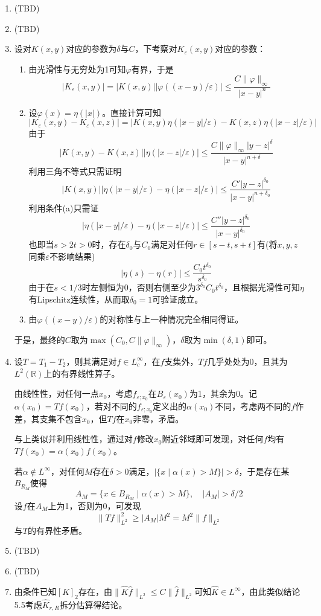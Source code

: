 \documentclass[a4paper,UTF8,fontset=windows]{ctexart}
\begin{document}
\begin{enumerate}
    \item (TBD)
    \item (TBD)
    \item 设对$K(x,y)$对应的参数为$\delta$与$C$，下考察对$K_\varepsilon(x,y)$对应的参数：
    \begin{enumerate}
        \item 由光滑性与无穷处为1可知$\varphi$有界，于是
        $$|K_\varepsilon(x,y)|=|K(x,y)||\varphi((x-y)/\varepsilon)|\le\frac{C\|\varphi\|_\infty}{|x-y|^n}$$
        \item 设$\varphi(x)=\eta(|x|)$。直接计算可知
        $$|K_\varepsilon(x,y)-K_\varepsilon(x,z)|=|K(x,y)\eta(|x-y|/\varepsilon)-K(x,z)\eta(|x-z|/\varepsilon)|$$
        由于
        $$|K(x,y)-K(x,z)||\eta(|x-z|/\varepsilon)|\le\frac{C\|\varphi\|_\infty|y-z|^\delta}{|x-y|^{n+\delta}}$$
        利用三角不等式只需证明
        $$|K(x,y)||\eta(|x-y|/\varepsilon)-\eta(|x-z|/\varepsilon)|\le\frac{C'|y-z|^{\delta_0}}{|x-y|^{n+\delta_0}}$$
        利用条件(a)只需证
        $$|\eta(|x-y|/\varepsilon)-\eta(|x-z|/\varepsilon)|\le \frac{C''|y-z|^{\delta_0}}{|x-y|^{\delta_0}}$$
        也即当$s>2t>0$时，存在$\delta_0$与$C_0$满足对任何$r\in[s-t,s+t]$有(将$x,y,z$同乘$\varepsilon$不影响结果)
        $$|\eta(s)-\eta(r)|\le\frac{C_0t^{\delta_0}}{s^{\delta_0}}$$
        由于在$s<1/3$时左侧恒为0，否则右侧至少为$3^{\delta_0} C_0t^{\delta_0}$，且根据光滑性可知$\eta$有Lipschitz连续性，从而取$\delta_0=1$可验证成立。

        \item 由$\varphi((x-y)/\varepsilon)$的对称性与上一种情况完全相同得证。
    \end{enumerate}
    于是，最终的$C$取为$\max(C_0,C\|\varphi\|_\infty)$，$\delta$取为$\min(\delta,1)$即可。

    \item 设$T=T_1-T_2$，则其满足对$f\in L_c^\infty$，在$f$支集外，$Tf$几乎处处为0，且其为$L^2(\mathbb{R})$上的有界线性算子。
    
    由线性性，对任何一点$x_0$，考虑$f_{\varepsilon;x_0}$在$B_\varepsilon(x_0)$为1，其余为0。记$\alpha(x_0)=Tf(x_0)$，若对不同的$f_{\varepsilon;x_0}$定义出的$\alpha(x_0)$不同，考虑两不同的$f$作差，其支集不包含$x_0$，但$Tf$在$x_0$非零，矛盾。

    与上类似并利用线性性，通过对$f$修改$x_0$附近邻域即可发现，对任何$f$均有$Tf(x_0)=\alpha(x_0)f(x_0)$。

    若$\alpha\notin L^\infty$，对任何$M$存在$\delta>0$满足，$|\{x\mid\alpha(x)>M\}|>\delta$，于是存在某$B_{R_M}$使得
    $$A_M=\{x\in B_{R_M}\mid\alpha(x)>M\},\quad|A_M|>\delta/2$$
    设$f$在$A_M$上为1，否则为0，可发现
    $$\|Tf\|_{L^2}^2\ge |A_M|M^2=M^2\|f\|_{L^2}$$
    与$T$的有界性矛盾。
    
    \item (TBD)
    
    \item (TBD)

    \item 由条件已知$[K]_2$存在，由$\|\hat{K}\hat{f}\|_{L^2}\le C\|\hat{f}\|_{L^2}$可知$\hat{K}\in L^\infty$，由此类似结论5.5考虑$\hat{K}_{r,R}$拆分估算得结论。
\end{enumerate}
\end{document}
